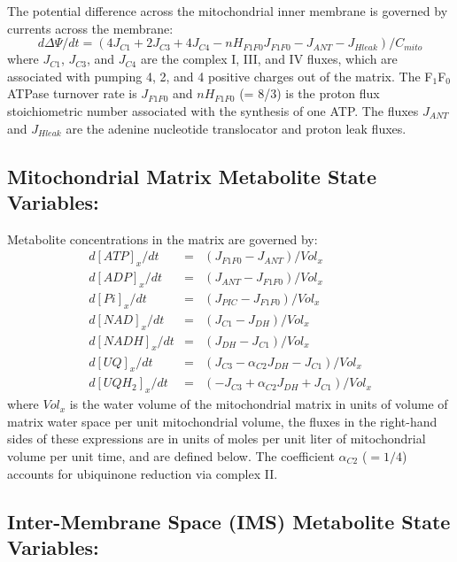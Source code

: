 \documentclass[fleqn,10pt]{physiome}
\begin{document}
The potential difference across the mitochondrial inner membrane is governed by currents across the membrane:
\begin{equation}\label{eq:1}
  d\Delta\Psi / dt = \left( 4J_{C1} + 2J_{C3} + 4J_{C4} - nH_{F1F0} J_{F1F0} - J_{ANT} - J_{Hleak} \right) / C_{mito}
\end{equation}
where $J_{C1}$, $J_{C3}$, and $J_{C4}$ are the complex I, III, and IV fluxes, which are associated with pumping 4, 2, and 4 positive charges out of the matrix. The F$_1$F$_0$ ATPase turnover rate is $J_{F1F0}$ and $nH_{F1F0}$ (= 8/3) is the proton flux stoichiometric number associated with the synthesis of one ATP. The fluxes $J_{ANT}$ and $J_{Hleak} $ are the adenine nucleotide translocator and proton leak fluxes. 

\subsection{Mitochondrial Matrix Metabolite State Variables:}

Metabolite concentrations in the matrix are governed by:
\begin{eqnarray}\label{eq:2}
  d[ATP]_x/dt  &=& \left(J_{F1F0} - J_{ANT} \right) / Vol_x \nonumber \\	
  d[ADP]_x/dt  &=& \left(J_{ANT} - J_{F1F0} \right) / Vol_x \nonumber\\
  d[Pi]_x/dt   &=& \left(J_{PIC} - J_{F1F0} \right) / Vol_x  \nonumber\\	
  d[NAD]_x/dt  &=& \left(J_{C1} - J_{DH} \right) / Vol_x \nonumber\\
  d[NADH]_x/dt &=& \left(J_{DH} - J_{C1} \right) / Vol_x \nonumber\\
  d[UQ]_x/dt   &=& \left(J_{C3} - \alpha_{C2} J_{DH} - J_{C1} \right) / Vol_x  \nonumber\\	
  d[UQH_2]_x/dt &=&  \left(-J_{C3} + \alpha_{C2} J_{DH} + J_{C1} \right) / Vol_x
\end{eqnarray}
where $Vol_x$ is the water volume of the mitochondrial matrix in units of volume of matrix water space per unit mitochondrial volume, the fluxes in the right-hand sides of these expressions are in units of moles per unit liter of mitochondrial volume per unit time, and are defined below. The coefficient $\alpha_{C2}$ ($=1/4$) accounts for ubiquinone reduction via complex II. 

\subsection{Inter-Membrane Space (IMS) Metabolite State Variables:}
\end{document}
